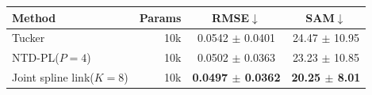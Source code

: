 \begin{tabular}{@{}l r c c@{}}
\toprule
Method & Params & RMSE$\downarrow$ & SAM$\downarrow$ \\
\midrule
Tucker & 10k & 0.0542 $\pm$ 0.0401 & 24.47 $\pm$ 10.95\\
NTD-PL($P=4$) & 10k & 0.0502 $\pm$ 0.0363 & 23.23 $\pm$ 10.85\\
Joint spline link($K=8$) & 10k & \textbf{0.0497 $\pm$ 0.0362} & \textbf{20.25 $\pm$ 8.01}\\
\bottomrule
\end{tabular}
